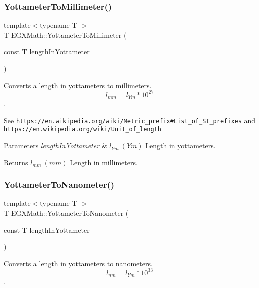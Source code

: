 \subsubsection{\texorpdfstring{Yottameter\+To\+Millimeter()}{YottameterToMillimeter()}}
{\footnotesize\ttfamily template$<$typename T $>$ \\
T E\+G\+X\+Math\+::\+Yottameter\+To\+Millimeter (\begin{DoxyParamCaption}\item[{const T}]{length\+In\+Yottameter }\end{DoxyParamCaption})}



Converts a length in yottameters to millimeters. \[ l_{mm}=l_{Ym} * 10^{27} \]. 

See \href{https://en.wikipedia.org/wiki/Metric_prefix#List_of_SI_prefixes}{\tt https\+://en.\+wikipedia.\+org/wiki/\+Metric\+\_\+prefix\#\+List\+\_\+of\+\_\+\+S\+I\+\_\+prefixes} and \href{https://en.wikipedia.org/wiki/Unit_of_length}{\tt https\+://en.\+wikipedia.\+org/wiki/\+Unit\+\_\+of\+\_\+length} 
\begin{DoxyParams}{Parameters}
{\em length\+In\+Yottameter} & $ l_{Ym}\ (Ym)$ Length in yottameters. \\
\hline
\end{DoxyParams}
\begin{DoxyReturn}{Returns}
$ l_{mm}\ (mm)$ Length in millimeters. 
\end{DoxyReturn}
\mbox{\label{group___e_g_x_math-_conversions-_length_conversions-_s_i-_yottameter-_s_i_ga9e117a640ecd0bea911edac05c685c31}} 
\subsubsection{\texorpdfstring{Yottameter\+To\+Nanometer()}{YottameterToNanometer()}}
{\footnotesize\ttfamily template$<$typename T $>$ \\
T E\+G\+X\+Math\+::\+Yottameter\+To\+Nanometer (\begin{DoxyParamCaption}\item[{const T}]{length\+In\+Yottameter }\end{DoxyParamCaption})}



Converts a length in yottameters to nanometers. \[ l_{nm}=l_{Ym} * 10^{33} \]. 

